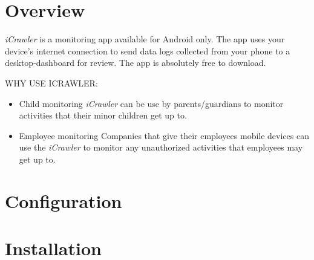 \documentclass[hidelinks, 12pt, oneside]{article}
\begin{document}
	
	\tableofcontents
	\newpage
	
	\section{Overview}
	\emph{iCrawler} is a monitoring app available for Android only. The app
	 uses your device's internet connection to send data logs collected from your phone to a desktop-dashboard
	 for review. The app is absolutely free to download.\newline\newline
	 
	 \uppercase{Why use iCrawler:}\newline
	 \begin{itemize}
		\item Child monitoring\newline
		\emph{iCrawler} can be use by parents/guardians to monitor activities that their minor
		 children get up to.	
		\item Employee monitoring\newline
		Companies that give their employees mobile devices can use the \emph{iCrawler} to monitor any 
		unauthorized activities that employees may get up to.
	\end{itemize}
	\newpage
	
	
	\section{Configuration}\newpage
	
	\section{Installation}\newpage
	
\end{document}
